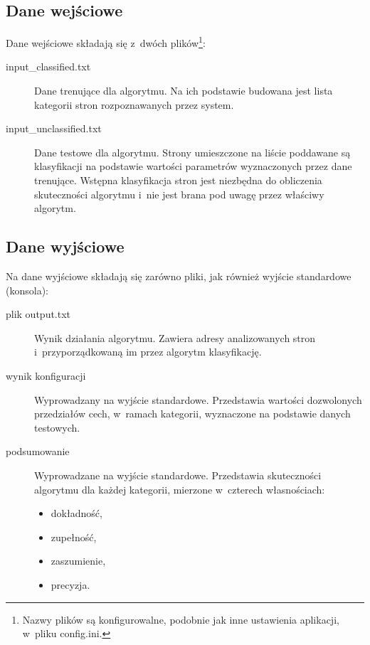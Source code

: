 \documentclass[a4paper,11pt]{article}
\begin{document}
\subsection{Dane wejściowe}

Dane wejściowe składają się z~dwóch plików\footnote{Nazwy plików są konfigurowalne, podobnie jak inne ustawienia aplikacji, w~pliku config.ini.}:

\begin{description}
    \item[input\_classified.txt] Dane trenujące dla algorytmu. Na ich podstawie budowana jest lista kategorii stron rozpoznawanych przez system.
    \item[input\_unclassified.txt] Dane testowe dla algorytmu. Strony umieszczone na liście poddawane są klasyfikacji na podstawie wartości parametrów wyznaczonych przez dane trenujące. Wstępna klasyfikacja stron jest niezbędna do obliczenia skuteczności algorytmu i~nie jest brana pod uwagę przez właściwy algorytm.
\end{description}

\subsection{Dane wyjściowe}

Na dane wyjściowe składają się zarówno pliki, jak również wyjście standardowe (konsola):

\begin{description}
    \item[plik output.txt] Wynik działania algorytmu. Zawiera adresy analizowanych stron i~przyporządkowaną im przez algorytm klasyfikację.
    \item[wynik konfiguracji] Wyprowadzany na wyjście standardowe. Przedstawia wartości dozwolonych przedziałów cech, w~ramach kategorii, wyznaczone na podstawie danych testowych.
    \item[podsumowanie] Wyprowadzane na wyjście standardowe. Przedstawia skuteczności algorytmu dla każdej kategorii, mierzone w~czterech własnościach:
        \begin{itemize}
            \item dokładność,
            \item zupełność,
            \item zaszumienie,
            \item precyzja.
        \end{itemize}
\end{description}
\end{document}

